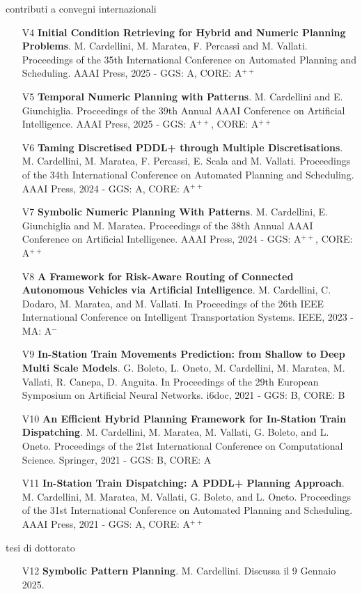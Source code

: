 \documentclass{resume} %
\begin{document}
\begin{rSection}{contributi a convegni internazionali}
\begin{enumerate}[leftmargin=5mm]
	\item[V4] \textbf{Initial Condition Retrieving for Hybrid and Numeric Planning Problems}. M. Cardellini, M. Maratea, F. Percassi and M. Vallati. Proceedings of the 35th International Conference on Automated Planning and Scheduling. AAAI Press, 2025 - GGS: A, CORE: A$^{++}$
	
	
	\item[V5] \textbf{Temporal Numeric Planning with Patterns}. M. Cardellini and E. Giunchiglia. Proceedings of the 39th Annual AAAI Conference on Artificial Intelligence. AAAI Press, 2025 - GGS: A$^{++}$, CORE: A$^{++}$
	
	\item[V6] \textbf{Taming Discretised PDDL+ through Multiple Discretisations}. M. Cardellini, M. Maratea, F. Percassi, E. Scala and M. Vallati. Proceedings of the 34th International Conference on Automated Planning and Scheduling. AAAI Press, 2024 - GGS: A, CORE: A$^{++}$
	
	\item[V7] \textbf{Symbolic Numeric Planning With Patterns}. M. Cardellini, E. Giunchiglia and M. Maratea. Proceedings of the 38th Annual AAAI Conference on Artificial Intelligence. AAAI Press, 2024 - GGS: A$^{++}$, CORE: A$^{++}$
	
	\item[V8] \textbf{A Framework for Risk-Aware Routing of Connected Autonomous Vehicles via Artificial Intelligence}. M. Cardellini, C. Dodaro, M. Maratea, and M. Vallati. In Proceedings of the 26th IEEE International Conference on Intelligent Transportation Systems. IEEE, 2023 - MA: A$^-$
	
	
	\item[V9] \textbf{In-Station Train Movements Prediction: from Shallow to Deep Multi Scale Models}. G. Boleto, L. Oneto, M. Cardellini, M. Maratea, M. Vallati, R. Canepa, D. Anguita. In Proceedings of the 29th European Symposium on Artificial Neural Networks. i6doc, 2021 - GGS: B, CORE: B
	
	\item[V10] \textbf{An Efficient Hybrid Planning Framework for In-Station Train Dispatching}. M. Cardellini, M. Maratea, M. Vallati, G. Boleto, and L. Oneto. Proceedings of the 21st International Conference on Computational Science. Springer, 2021 - GGS: B, CORE: A
	
	\item[V11] \textbf{In-Station Train Dispatching: A PDDL+ Planning Approach}. M. Cardellini, M. Maratea, M. Vallati, G. Boleto, and L. Oneto. Proceedings of the 31st International Conference on Automated Planning and Scheduling. AAAI Press, 2021 - GGS: A, CORE: A$^{++}$
\end{enumerate}
\end{rSection}

 \begin{rSection}{tesi di dottorato}
  \begin{enumerate}[leftmargin=5mm]
	\item[V12] \textbf{Symbolic Pattern Planning}. M. Cardellini. Discussa il 9 Gennaio 2025.	
	\end{enumerate}
 \end{rSection}
\end{document}
